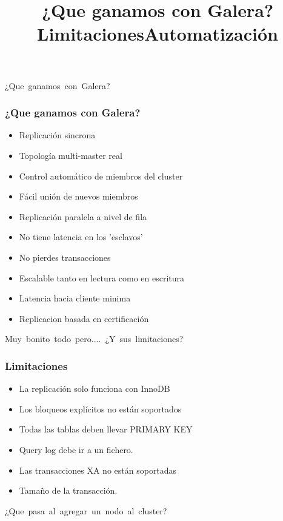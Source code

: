 \documentclass[UTF8]{beamer}
\begin{document}
\title[¿Que ganamos?]{¿Que ganamos con Galera?}
\begin{frame}
	\centering
	\mbox{¿Que ganamos con Galera?}	
\end{frame}


\begin{frame}
	\frametitle{¿Que ganamos con Galera?}
	\begin{itemize}
		\item Replicación sincrona
		\pause
		\item Topología multi-master real
		\pause
		\item Control automático de miembros del cluster
		\pause
		\item Fácil unión de nuevos miembros
		\pause
		\item Replicación paralela a nivel de fila
		\pause
		\item No tiene latencia en los 'esclavos'
		\pause
		\item No pierdes transacciones
		\pause
		\item Escalable tanto en lectura como en escritura
		\pause
		\item Latencia hacia cliente minima
		\pause
		\item Replicacion basada en certificación
	\end{itemize}
\end{frame}


\title[Limitaciones]{Limitaciones}
\begin{frame}
	\centering
	\mbox{Muy bonito todo pero.... ¿Y sus limitaciones?}	
\end{frame}


\begin{frame}
	\frametitle[Limitaciones]{Limitaciones}
	\begin{itemize}
		\item La replicación solo funciona con InnoDB
		\pause
		\item Los bloqueos explícitos no están soportados
		\pause
		\item Todas las tablas deben llevar PRIMARY KEY
		\pause
		\item Query log debe ir a un fichero.
		\pause
		\item Las transacciones XA no están soportadas
		\pause
		\item Tamaño de la transacción.
	\end{itemize}
\end{frame}

\title[Automatización]{Automatización}
\begin{frame}
	\centering
	\mbox{¿Que pasa al agregar un nodo al cluster?}	
\end{frame}
\end{document}
